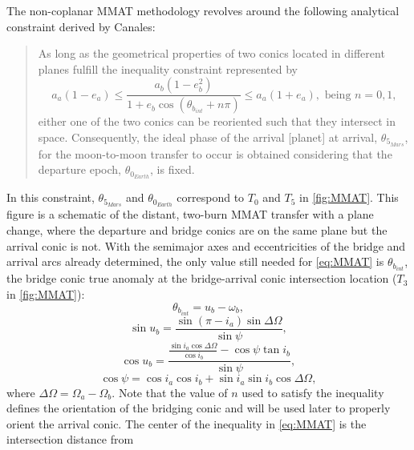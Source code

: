The non-coplanar MMAT methodology revolves around the following analytical constraint derived by
Canales\cite{Canales:2021b}:
\begin{quote}
    As long as the geometrical properties of two conics located in different planes fulfill the
    inequality constraint represented by
    \begin{equation}
        a_{a}(1-e_{a})\leq\frac{a_{b}(1-e_{b}^{2})}{1+e_{b}\cos(\theta_{b_{int}}+n\pi)}\leq a_{a}(1+e_{a}),\text{ being }n=0,1,
        \label{eq:MMAT}
    \end{equation}
    either one of the two conics can be reoriented such that they intersect in space. Consequently,
    the ideal phase of the arrival [planet] at arrival, $\theta_{5_{Mars}}$, for the moon-to-moon
    transfer to occur is obtained considering that the departure epoch, $\theta_{0_{Earth}}$, is
    fixed.
\end{quote}
In this constraint, $\theta_{5_{Mars}}$ and $\theta_{0_{Earth}}$ correspond to $T_{0}$ and $T_{5}$
in \cref{fig:MMAT}. This figure is a schematic of the distant, two-burn MMAT transfer with a plane
change, where the departure and bridge conics are on the same plane but the arrival conic is not.
With the semimajor axes and eccentricities of the bridge and arrival arcs already determined, the
only value still needed for \cref{eq:MMAT} is $\theta_{b_{int}}$, the bridge conic true anomaly at
the bridge-arrival conic intersection location ($T_{3}$ in \cref{fig:MMAT}):
\begin{equation}
    \theta_{b_{int}}=u_{b}-\omega_{b},
    \label{eq:bridgeintersect}
\end{equation}
\begin{equation}
    \sin u_{b}=\frac{\sin(\pi-i_{a})\sin\Delta\Omega}{\sin\psi},
    \label{eq:bridgesinu}
\end{equation}
\begin{equation}
    \cos u_{b}=\frac{\frac{\sin i_{a}\cos\Delta\Omega}{\cos i_{b}}-\cos\psi\tan i_{b}}{\sin\psi},
    \label{eq:bridgecosu}
\end{equation}
\begin{equation}
    \cos\psi=\cos i_{a}\cos i_{b}+\sin i_{a}\sin i_{b}\cos\Delta\Omega,
\end{equation}
where $\Delta\Omega=\Omega_{a}-\Omega_{b}$. Note that the value of $n$ used to satisfy the
inequality defines the orientation of the bridging conic and will be used later to properly orient
the arrival conic. The center of the inequality in \cref{eq:MMAT} is the intersection distance from
